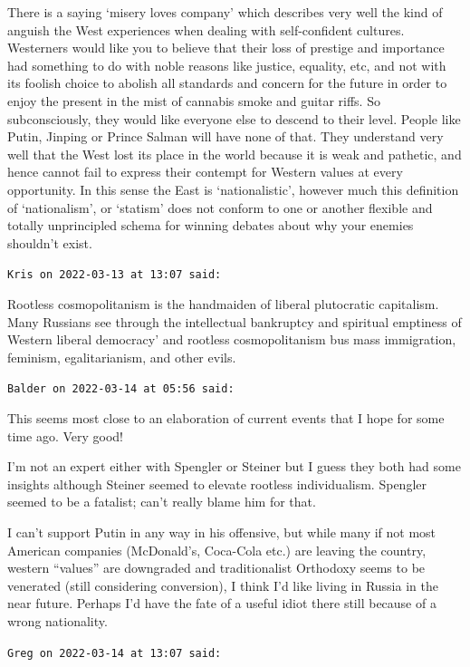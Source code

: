 \begin{footnotesize}
\begin{sffamily}
There is a saying `misery loves company' which describes very well the kind of anguish the West experiences when dealing with self-confident cultures. Westerners would like you to believe that their loss of prestige and importance had something to do with noble reasons like justice, equality, etc, and not with its foolish choice to abolish all standards and concern for the future in order to enjoy the present in the mist of cannabis smoke and guitar riffs. So subconsciously, they would like everyone else to descend to their level. People like Putin, Jinping or Prince Salman will have none of that. They understand very well that the West lost its place in the world because it is weak and pathetic, and hence cannot fail to express their contempt for Western values at every opportunity. In this sense the East is `nationalistic', however much this definition of `nationalism', or `statism' does not conform to one or another flexible and totally unprincipled schema for winning debates about why your enemies shouldn't exist.

\hfill

\texttt{Kris on 2022-03-13 at 13:07 said:}

Rootless cosmopolitanism is the handmaiden of liberal plutocratic capitalism. Many Russians see through the intellectual bankruptcy and spiritual emptiness of Western liberal democracy' and rootless cosmopolitanism bus mass immigration, feminism, egalitarianism, and other evils.

\hfill

\texttt{Balder on 2022-03-14 at 05:56 said:}

This seems most close to an elaboration of current events that I hope for some time ago. Very good!

I'm not an expert either with Spengler or Steiner but I guess they both had some insights although Steiner seemed to elevate rootless individualism. Spengler seemed to be a fatalist; can't really blame him for that.

I can't support Putin in any way in his offensive, but while many if not most American companies (McDonald's, Coca-Cola etc.) are leaving the country, western ``values'' are downgraded and traditionalist Orthodoxy seems to be venerated (still considering conversion), I think I'd like living in Russia in the near future. Perhaps I'd have the fate of a useful idiot there still because of a wrong nationality.

\hfill

\texttt{Greg on 2022-03-14 at 13:07 said:}


\end{sffamily}
\end{footnotesize}
